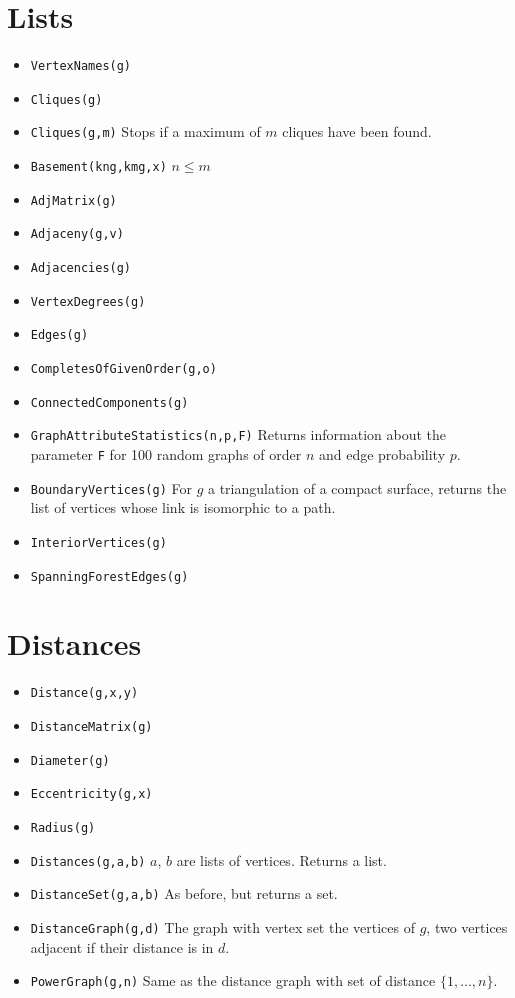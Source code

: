 \documentclass[11pt]{article}
\begin{document}
\begin{multicols}{3}
\section{Lists}
\label{sec:org1b891f4}
\begin{itemize}
\item \texttt{VertexNames(g)}
\item \texttt{Cliques(g)}
\item \texttt{Cliques(g,m)} Stops if a maximum of \(m\) cliques have been found.
\item \texttt{Basement(kng,kmg,x)} \(n\leq m\)
\item \texttt{AdjMatrix(g)}
\item \texttt{Adjaceny(g,v)}
\item \texttt{Adjacencies(g)}
\item \texttt{VertexDegrees(g)}
\item \texttt{Edges(g)}
\item \texttt{CompletesOfGivenOrder(g,o)}
\item \texttt{ConnectedComponents(g)}
\item \texttt{GraphAttributeStatistics(n,p,F)} Returns information about the
parameter \texttt{F} for 100 random graphs of order \(n\) and edge
probability \(p\).
\item \texttt{BoundaryVertices(g)} For \(g\) a triangulation of a compact
surface, returns the list of vertices whose link is isomorphic to a
path.
\item \texttt{InteriorVertices(g)}
\item \texttt{SpanningForestEdges(g)}
\end{itemize}

\section{Distances}
\label{sec:org8f1c0f3}
\begin{itemize}
\item \texttt{Distance(g,x,y)}
\item \texttt{DistanceMatrix(g)}
\item \texttt{Diameter(g)}
\item \texttt{Eccentricity(g,x)}
\item \texttt{Radius(g)}
\item \texttt{Distances(g,a,b)} \(a\), \(b\) are lists of vertices. Returns a list.
\item \texttt{DistanceSet(g,a,b)} As before, but returns a set.
\item \texttt{DistanceGraph(g,d)} The graph with vertex set the vertices of
\(g\), two vertices adjacent if their distance is in \(d\).
\item \texttt{PowerGraph(g,n)} Same as the distance graph with set of distance
\(\{1,\ldots,n\}\).
\end{itemize}


\end{multicols}
\end{document}

